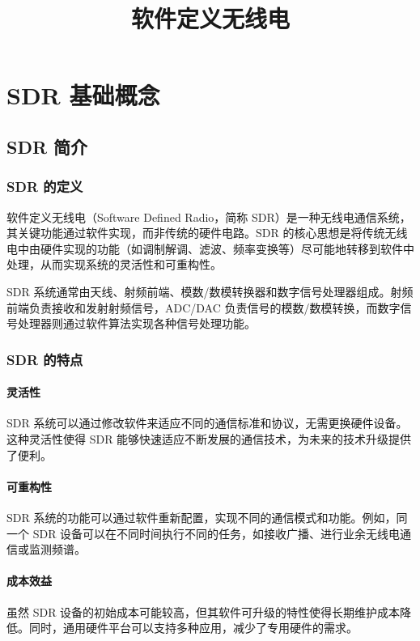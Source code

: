 \documentclass[UTF8]{ctexbook}
\title{软件定义无线电}
\author{}
\date{}
\begin{document}
\maketitle

\tableofcontents

\chapter{SDR 基础概念}
\section{SDR 简介}
\subsection{SDR 的定义}
软件定义无线电（Software Defined Radio，简称 SDR）是一种无线电通信系统，其关键功能通过软件实现，而非传统的硬件电路。SDR 的核心思想是将传统无线电中由硬件实现的功能（如调制解调、滤波、频率变换等）尽可能地转移到软件中处理，从而实现系统的灵活性和可重构性。

SDR 系统通常由天线、射频前端、模数/数模转换器和数字信号处理器组成。射频前端负责接收和发射射频信号，ADC/DAC 负责信号的模数/数模转换，而数字信号处理器则通过软件算法实现各种信号处理功能。

\subsection{SDR 的特点}
\subsubsection{灵活性}
SDR 系统可以通过修改软件来适应不同的通信标准和协议，无需更换硬件设备。这种灵活性使得 SDR 能够快速适应不断发展的通信技术，为未来的技术升级提供了便利。

\subsubsection{可重构性}
SDR 系统的功能可以通过软件重新配置，实现不同的通信模式和功能。例如，同一个 SDR 设备可以在不同时间执行不同的任务，如接收广播、进行业余无线电通信或监测频谱。

\subsubsection{成本效益}
虽然 SDR 设备的初始成本可能较高，但其软件可升级的特性使得长期维护成本降低。同时，通用硬件平台可以支持多种应用，减少了专用硬件的需求。
\end{document}
